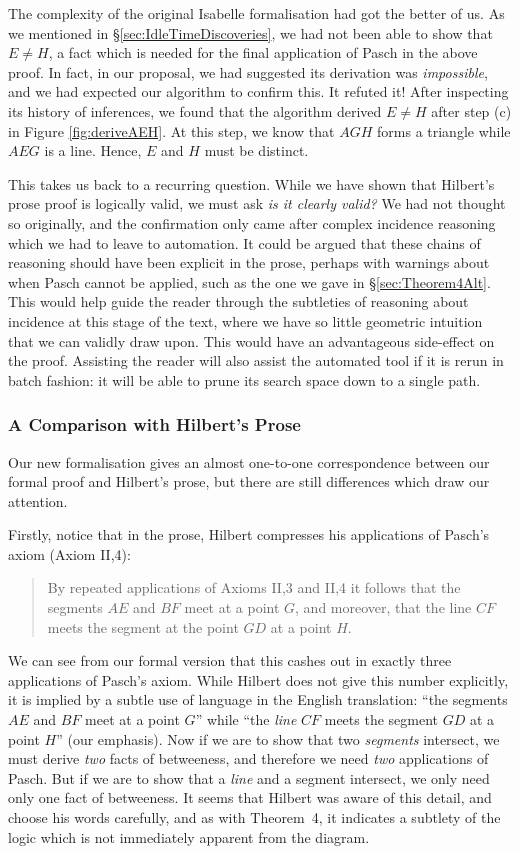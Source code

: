 The complexity of the original Isabelle formalisation had got the better of us. As we mentioned in \S\ref{sec:IdleTimeDiscoveries}, we had not been able to show that $E \neq H$, a fact which is needed for the final application of Pasch in the above proof. In fact, in our proposal, we had suggested its derivation was \emph{impossible}, and we had expected our algorithm to confirm this. It refuted it! After inspecting its history of inferences, we found that the algorithm derived $E\neq H$ after step (c) in Figure \ref{fig:deriveAEH}. At this step, we know that $AGH$ forms a triangle while $AEG$ is a line. Hence, $E$ and $H$ must be distinct.

This takes us back to a recurring question. While we have shown that Hilbert's prose proof is logically valid, we must ask \emph{is it \emph{clearly} valid?} We had not thought so originally, and the confirmation only came after complex incidence reasoning which we had to leave to automation. It could be argued that these chains of reasoning should have been explicit in the prose, perhaps with warnings about when Pasch cannot be applied, such as the one we gave in \S\ref{sec:Theorem4Alt}. This would help guide the reader through the subtleties of reasoning about incidence at this stage of the text, where we have so little geometric intuition that we can validly draw upon. This would have an advantageous side-effect on the proof. Assisting the reader will also assist the automated tool if it is rerun in batch fashion: it will be able to prune its search space down to a single path.

\subsubsection{A Comparison with Hilbert's Prose}
Our new formalisation gives an almost one-to-one correspondence between our formal proof and Hilbert's prose, but there are still differences which draw our attention.

Firstly, notice that in the prose, Hilbert compresses his applications of Pasch's axiom (Axiom II,4):

\begin{quote}
By repeated applications of Axioms II,3 and II,4 it follows that the segments $AE$ and $BF$ meet at a point $G$, and moreover, that the line $CF$ meets the segment at the point $GD$ at a point $H$.
\end{quote}

We can see from our formal version that this cashes out in exactly three applications of Pasch's axiom. While Hilbert does not give this number explicitly, it is implied by a subtle use of language in the English translation: ``the segments $AE$ and $BF$ meet at a point $G$'' while ``the \emph{line} $CF$ meets the segment $GD$ at a point $H$'' (our emphasis). Now if we are to show that two \emph{segments} intersect, we must derive \emph{two} facts of betweeness, and therefore we need \emph{two} applications of Pasch. But if we are to show that a \emph{line} and a segment intersect, we only need only one fact of betweeness. It seems that Hilbert was aware of this detail, and choose his words carefully, and as with Theorem~4, it indicates a subtlety of the logic which is not immediately apparent from the diagram.

